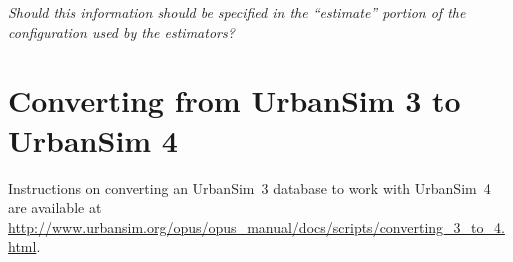 \emph{Should this information should be specified in the ``estimate'' portion of
the configuration used by the estimators?}

\section{Converting from UrbanSim 3 to UrbanSim 4}

Instructions on converting an UrbanSim~3 database to work with UrbanSim~4 are
available at \mbox{\url{http://www.urbansim.org/opus/opus_manual/docs/scripts/converting_3_to_4.html}}.

